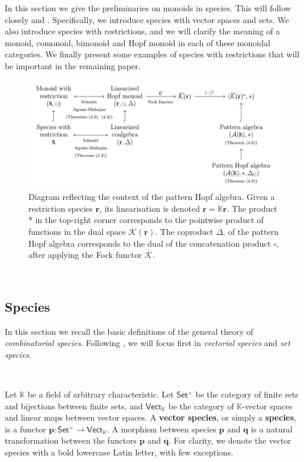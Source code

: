 \documentclass[12pt, reqno]{amsart}
\theoremstyle{definition}
\newcommand{\Fset}{\mathsf{Set^{\times}}}
\newcommand{\Vect}{\mathsf{Vect}}
\newcommand{\tp}{\mathbf{p}}
\newcommand{\tq}{\mathbf{q}}
\newcommand{\tr}{\mathbf{r}}
\begin{document}
In this section we give the preliminaries on monoids in species.
This will follow closely \cite{AM2010} and \cite{Schmitt1993}.
Specifically, we introduce species with vector spaces and sets.
We also introduce species with restrictions, and we will clarify the meaning of a monoid, comonoid, bimonoid and Hopf monoid in each of these monoidal categories.
We finally present some examples of species with restrictions that will be important in the remaining paper.


\begin{figure}
\centering
\includegraphics[scale=.6]{../images/comuting_diagram_algebras.png}
\caption{Diagram reflecting the context of the pattern Hopf algebra. 
Given a restriction species $\tr$, its linearisation is denoted $\mathbf{r} = \mathbb{K}\tr$. 
The product $\ast$ in the top-right corner corresponds to the pointwise product of functions in the dual space $\overline{\mathcal{K}}(\mathbf{r})$. The coproduct $\Delta_{\square} $ of the pattern Hopf algebra corresponds to the dual of the concatenation product $\square$, after applying the Fock functor $\overline{\mathcal{K}}$.}
\end{figure}

\

\subsection{Species}
In this section we recall the basic definitions of the general theory of \emph{combinatorial species}. Following \cite{AM2010}, we will focus first in \emph{vectorial species} and \emph{set species}.

\

Let $\mathbb{K}$ be a field of arbitrary characteristic. Let $\Fset$ be the category of finite sets and bijections between finite sets, and $\Vect_{\mathbb{K}}$ be the category of $\mathbb{K}$-vector spaces and linear maps between vector spaces. A {\bf vector species}, or simply a \textbf{species}, is a functor $\tp: \Fset \to \Vect_{\mathbb{K}}$. A morphism between species $\tp$ and $\tq$ is a natural transformation between the functors $\tp$ and $\tq$.
For clarity, we denote the vector species with a bold lowercase Latin letter, with few exceptions.
\end{document}
